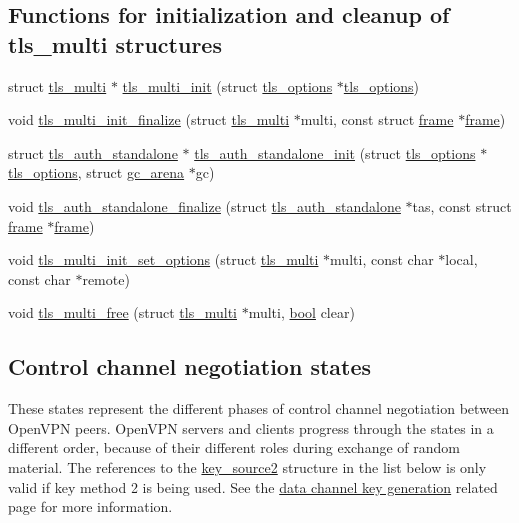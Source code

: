 \subsection*{Functions for initialization and cleanup of tls\+\_\+multi structures}
\begin{DoxyCompactItemize}
\item 
struct \hyperlink{structtls__multi}{tls\+\_\+multi} $\ast$ \hyperlink{group__control__processor_gaf7223d904613a08407ae52dc3831d7a2}{tls\+\_\+multi\+\_\+init} (struct \hyperlink{structtls__options}{tls\+\_\+options} $\ast$\hyperlink{structtls__options}{tls\+\_\+options})
\item 
void \hyperlink{group__control__processor_gada87c9f2a7755ab7507dd16fa6e22716}{tls\+\_\+multi\+\_\+init\+\_\+finalize} (struct \hyperlink{structtls__multi}{tls\+\_\+multi} $\ast$multi, const struct \hyperlink{structframe}{frame} $\ast$\hyperlink{structframe}{frame})
\item 
struct \hyperlink{structtls__auth__standalone}{tls\+\_\+auth\+\_\+standalone} $\ast$ \hyperlink{group__control__processor_ga03aaa9093737daae72627dc38198dd1d}{tls\+\_\+auth\+\_\+standalone\+\_\+init} (struct \hyperlink{structtls__options}{tls\+\_\+options} $\ast$\hyperlink{structtls__options}{tls\+\_\+options}, struct \hyperlink{structgc__arena}{gc\+\_\+arena} $\ast$gc)
\item 
void \hyperlink{group__control__processor_ga85674d980185b3f2923ae9540114289a}{tls\+\_\+auth\+\_\+standalone\+\_\+finalize} (struct \hyperlink{structtls__auth__standalone}{tls\+\_\+auth\+\_\+standalone} $\ast$tas, const struct \hyperlink{structframe}{frame} $\ast$\hyperlink{structframe}{frame})
\item 
void \hyperlink{group__control__processor_gafe3228d8a3cae5eb8f159e8230f4cd27}{tls\+\_\+multi\+\_\+init\+\_\+set\+\_\+options} (struct \hyperlink{structtls__multi}{tls\+\_\+multi} $\ast$multi, const char $\ast$local, const char $\ast$remote)
\item 
void \hyperlink{group__control__processor_ga3f6dae3fb4465d1c697a80fdebd50d67}{tls\+\_\+multi\+\_\+free} (struct \hyperlink{structtls__multi}{tls\+\_\+multi} $\ast$multi, \hyperlink{automatic_8c_abb452686968e48b67397da5f97445f5b}{bool} clear)
\end{DoxyCompactItemize}
\subsection*{Control channel negotiation states}
\label{_amgrp074f583fcd32a701d71d3a0081fec6b1}%
These states represent the different phases of control channel negotiation between Open\+V\+P\+N peers. Open\+V\+P\+N servers and clients progress through the states in a different order, because of their different roles during exchange of random material. The references to the {\ttfamily \hyperlink{structkey__source2}{key\+\_\+source2}} structure in the list below is only valid if key method 2 is being used. See the \hyperlink{}{data channel key generation} related page for more information.

